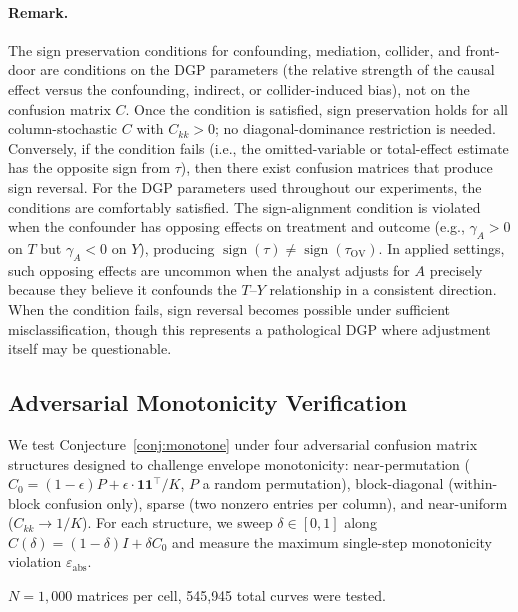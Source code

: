 \paragraph{Remark.}
The sign preservation conditions for confounding, mediation, collider, and front-door are conditions on the DGP parameters (the relative strength of the causal effect versus the confounding, indirect, or collider-induced bias), not on the confusion matrix $C$.
Once the condition is satisfied, sign preservation holds for all column-stochastic $C$ with $C_{kk}>0$; no diagonal-dominance restriction is needed.
Conversely, if the condition fails (i.e., the omitted-variable or total-effect estimate has the opposite sign from $\tau$), then there exist confusion matrices that produce sign reversal.
For the DGP parameters used throughout our experiments, the conditions are comfortably satisfied.
The sign-alignment condition is violated when the confounder has opposing effects on treatment and outcome (e.g., $\gamma_A > 0$ on $T$ but $\gamma_A < 0$ on $Y$), producing $\operatorname{sign}(\tau) \neq \operatorname{sign}(\tau_{\mathrm{OV}})$. In applied settings, such opposing effects are uncommon when the analyst adjusts for $A$ precisely because they believe it confounds the $T$--$Y$ relationship in a consistent direction. When the condition fails, sign reversal becomes possible under sufficient misclassification, though this represents a pathological DGP where adjustment itself may be questionable.

\subsection{Adversarial Monotonicity Verification}
\label{app:adversarial_monotonicity}

We test Conjecture~\ref{conj:monotone} under four adversarial confusion matrix structures designed to challenge envelope monotonicity: near-permutation ($C_0 = (1{-}\epsilon)P + \epsilon \cdot \mathbf{1}\mathbf{1}^\top/K$, $P$ a random permutation), block-diagonal (within-block confusion only), sparse (two nonzero entries per column), and near-uniform ($C_{kk} \to 1/K$). For each structure, we sweep $\delta \in [0,1]$ along $C(\delta) = (1{-}\delta)I + \delta C_0$ and measure the maximum single-step monotonicity violation $\varepsilon_{\mathrm{abs}}$.

$N{=}1{,}000$ matrices per cell, 545{,}945 total curves were tested.

